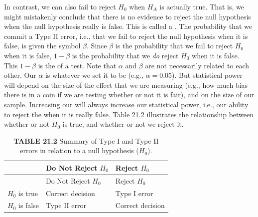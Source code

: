 \documentclass[
  openany]{krantz}
\begin{document}
\newpage

In contrast, we can also fail to reject \(H_{0}\) when \(H_{A}\) is actually true.
That is, we might mistakenly conclude that there is no evidence to reject the null hypothesis when the null hypothesis really is false.
This is called a \textbf{}.
The probability that we commit a Type II error, i.e., that we fail to reject the null hypothesis when it is false, is given the symbol \(\beta\).
Since \(\beta\) is the probability that we fail to reject \(H_{0}\) when it is false, \(1 - \beta\) is the probability that we \emph{do} reject \(H_{0}\) when it is false.
This \(1 - \beta\) is the \textbf{} of a test.
Note that \(\alpha\) and \(\beta\) are not necessarily related to each other.
Our \(\alpha\) is whatever we set it to be (e.g., \(\alpha = 0.05\)).
But statistical power will depend on the size of the effect that we are measuring (e.g., how much bias there is in a coin if we are testing whether or not it is fair), and on the size of our sample.
Increasing our  will always increase our statistical power, i.e., our ability to reject the  when it is really false.
Table 21.2 illustrates the relationship between whether or not \(H_{0}\) is true, and whether or not we reject it.

\begin{longtable}[]{@{}lll@{}}
\caption{\textbf{TABLE 21.2} Summary of Type I and Type II errors in relation to a null hypothesis (\(H_{0}\)).}\tabularnewline
\toprule
& Do Not Reject \(H_{0}\) & Reject \(H_{0}\) \\
\midrule
\endfirsthead
\toprule
& Do Not Reject \(H_{0}\) & Reject \(H_{0}\) \\
\midrule
\endhead
\(H_{0}\) is true & Correct decision & Type I error \\
\(H_{0}\) is false & Type II error & Correct decision \\
\bottomrule
\end{longtable}
\end{document}
